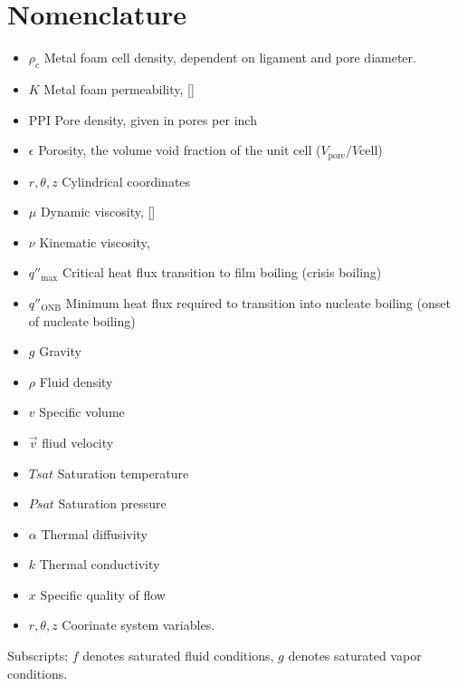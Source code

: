 \documentclass[compileTAMUreport.tex]{subfiles}
\begin{document}
\chapter{Nomenclature}

\begin{itemize}
\item $\rho_c$ Metal foam cell density, dependent on ligament and pore diameter.
\item $K$ Metal foam permeability, [\metre\squared]
\item $\mathrm{PPI}$ Pore density, given in pores per inch 
\item $\epsilon$ Porosity, the volume void fraction of the unit cell ($V_{\mathrm{pore}}/V{\mathrm{cell}}$)
\item $r,\theta, z$ Cylindrical coordinates
\item $\mu$ Dynamic viscosity, [\newton\second\per\meter\squared ]
\item $\nu$ Kinematic viscosity, \metre\per\second\squared
\item $q''_{\mathrm{max}}$ Critical heat flux transition to film boiling (crisis boiling)
\item $q''_{\mathrm{ONB}}$ Minimum heat flux required to transition into nucleate boiling (onset of nucleate boiling)
\item $g$ Gravity
\item $\rho$ Fluid density 
\item $v$ Specific volume
\item $\vec{v}$ fliud velocity
\item $Tsat$ Saturation temperature
\item $Psat$ Saturation pressure
\item $\alpha$ Thermal diffusivity
\item $k$ Thermal conductivity
\item $x$ Specific quality of flow
\item $r,\theta ,z$ Coorinate system variables.
\end{itemize}

Subscripts: $f$ denotes saturated fluid conditions, $g$ denotes saturated vapor conditions.
\end{document}
